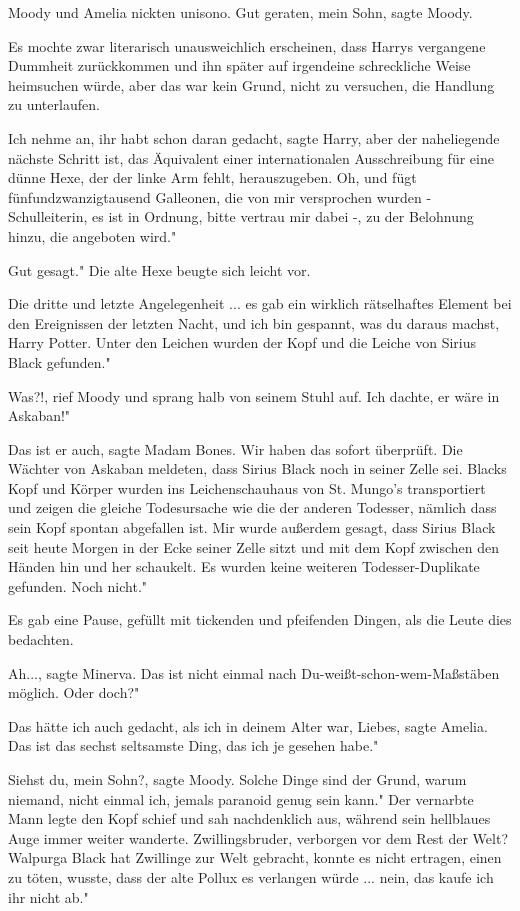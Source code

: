 Moody und Amelia nickten unisono. \glqq Gut geraten, mein Sohn\grqq{}, sagte
Moody.

Es mochte zwar literarisch unausweichlich erscheinen, dass Harrys vergangene
Dummheit zurückkommen und ihn später auf irgendeine schreckliche Weise
heimsuchen würde, aber das war kein Grund, nicht zu versuchen, die Handlung zu
unterlaufen.

\glqq Ich nehme an, ihr habt schon daran gedacht\grqq{}, sagte Harry, \glqq aber
der naheliegende nächste Schritt ist, das Äquivalent einer internationalen
Ausschreibung für eine dünne Hexe, der der linke Arm fehlt, herauszugeben. Oh,
und fügt fünfundzwanzigtausend Galleonen, die von mir versprochen wurden -
Schulleiterin, es ist in Ordnung, bitte vertrau mir dabei -, zu der Belohnung
hinzu, die angeboten wird."

\glqq Gut gesagt." Die alte Hexe beugte sich leicht vor.

\glqq Die dritte und letzte Angelegenheit ... es gab ein wirklich rätselhaftes
Element bei den Ereignissen der letzten Nacht, und ich bin gespannt, was du
daraus machst, Harry Potter. Unter den Leichen wurden der Kopf und die Leiche
von Sirius Black gefunden."

\glqq Was?!\grqq{}, rief Moody und sprang halb von seinem Stuhl auf. \glqq Ich
dachte, er wäre in Askaban!"

\glqq Das ist er auch\grqq{}, sagte Madam Bones. \glqq Wir haben das sofort
überprüft. Die Wächter von Askaban meldeten, dass Sirius Black noch in seiner
Zelle sei. Blacks Kopf und Körper wurden ins Leichenschauhaus von St. Mungo's
transportiert und zeigen die gleiche Todesursache wie die der anderen Todesser,
nämlich dass sein Kopf spontan abgefallen ist. Mir wurde außerdem gesagt, dass
Sirius Black seit heute Morgen in der Ecke seiner Zelle sitzt und mit dem Kopf
zwischen den Händen hin und her schaukelt. Es wurden keine weiteren
Todesser-Duplikate gefunden. Noch nicht."

Es gab eine Pause, gefüllt mit tickenden und pfeifenden Dingen, als die Leute
dies bedachten.

\glqq Ah...\grqq{}, sagte Minerva. \glqq Das ist nicht einmal nach
Du-weißt-schon-wem-Maßstäben möglich. Oder doch?"

\glqq Das hätte ich auch gedacht, als ich in deinem Alter war, Liebes\grqq{},
sagte Amelia. \glqq Das ist das sechst seltsamste Ding, das ich je gesehen
habe."

\glqq Siehst du, mein Sohn?\grqq{}, sagte Moody. \glqq Solche Dinge sind der
Grund, warum niemand, nicht einmal ich, jemals paranoid genug sein kann." Der
vernarbte Mann legte den Kopf schief und sah nachdenklich aus, während sein
hellblaues Auge immer weiter wanderte. \glqq Zwillingsbruder, verborgen vor dem
Rest der Welt? Walpurga Black hat Zwillinge zur Welt gebracht, konnte es nicht
ertragen, einen zu töten, wusste, dass der alte Pollux es verlangen würde ...
nein, das kaufe ich ihr nicht ab."

